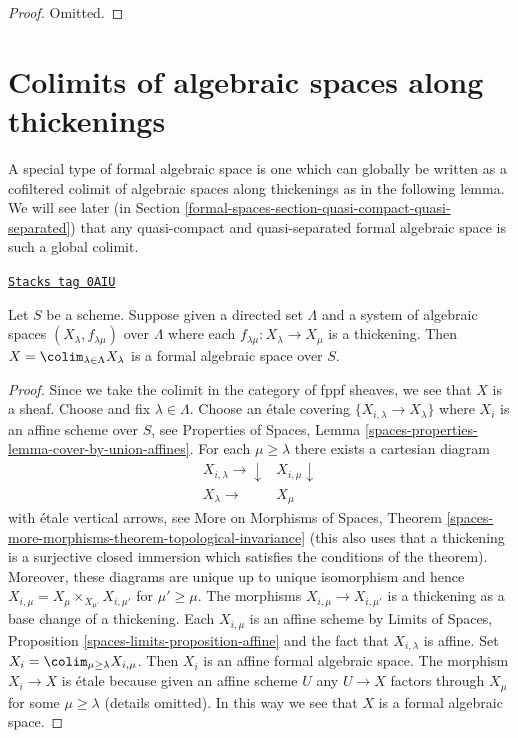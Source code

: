 \begin{proof}
Omitted.
\end{proof}

\section{Colimits of algebraic spaces along thickenings}
\label{formal-spaces-section-global-colimits}
A special type of formal algebraic space is one which can globally
be written as a cofiltered colimit of algebraic spaces along
thickenings as in the following lemma. We will see later
(in Section \ref{formal-spaces-section-quasi-compact-quasi-separated})
that any quasi-compact and quasi-separated formal algebraic space
is such a global colimit.

\begin{lemma}
\label{formal-spaces-lemma-colimit-is-formal}
\href{https://stacks.math.columbia.edu/tag/0AIU}{\texttt{Stacks tag 0AIU}}

Let $S$ be a scheme. Suppose given a directed set
$\Lambda$ and a system of algebraic spaces $(X_\lambda, f_{\lambda \mu})$
over $\Lambda$ where each $f_{\lambda \mu} : X_\lambda \to X_\mu$ is a
thickening. Then $X = \colim_{\lambda \in \Lambda} X_\lambda$
is a formal algebraic space over $S$.
\end{lemma}

\begin{proof}
Since we take the colimit in the category of fppf sheaves, we
see that $X$ is a sheaf. Choose and fix $\lambda \in \Lambda$. Choose an
\'etale covering $\{X_{i, \lambda} \to X_\lambda\}$ where $X_i$ is an affine
scheme over $S$, see Properties of Spaces, Lemma
\ref{spaces-properties-lemma-cover-by-union-affines}.
For each $\mu \geq \lambda$ there exists a cartesian diagram
$$
\begin{array}{cc}X_{i, \lambda} \longrightarrow\downarrow & X_{i, \mu} \downarrow \\ X_\lambda \longrightarrow & X_\mu\end{array}
$$
with \'etale vertical arrows, see
More on Morphisms of Spaces, Theorem
\ref{spaces-more-morphisms-theorem-topological-invariance}
(this also uses that a thickening is a surjective closed immersion which
satisfies the conditions of the theorem). Moreover, these diagrams are
unique up to unique isomorphism and hence
$X_{i, \mu} = X_\mu \times_{X_{\mu'}} X_{i, \mu'}$ for
$\mu' \geq \mu$. The morphisms $X_{i, \mu} \to X_{i, \mu'}$
is a thickening as a base change of a thickening. Each $X_{i, \mu}$
is an affine scheme by Limits of Spaces, Proposition
\ref{spaces-limits-proposition-affine} and the fact that
$X_{i, \lambda}$ is affine.
Set $X_i = \colim_{\mu \geq \lambda} X_{i, \mu}$. Then $X_i$ is
an affine formal algebraic space. The morphism $X_i \to X$
is \'etale because given an affine scheme $U$ any $U \to X$
factors through $X_\mu$ for some $\mu \geq \lambda$ (details omitted).
In this way we see that $X$ is a formal algebraic space.
\end{proof}

